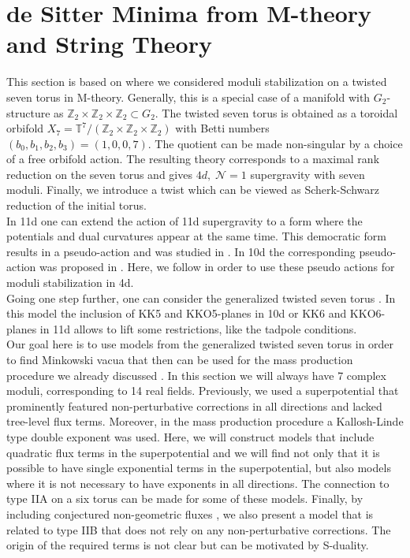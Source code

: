\documentclass[a4paper,12pt,twoside,openright]{report}
\begin{document}
\section{de Sitter Minima from M-theory and String Theory}
\label{sec:mtheory}
This section is based on \cite{Cribiori:2019hrb} where we considered moduli stabilization on a twisted seven torus in M-theory. Generally, this is a special case of a manifold with $G_2$-structure as $\mathbb{Z}_2 \times \mathbb{Z}_2 \times \mathbb{Z}_2 \subset G_2$. The twisted seven torus is obtained as a toroidal orbifold $X_7 = \mathbb{T}^7/(\mathbb{Z}_2 \times \mathbb{Z}_2 \times \mathbb{Z}_2)$ \cite{DallAgata:2005zlf,Duff:2010vy,Derendinger:2014wwa,Ferrara:2016fwe} with Betti numbers $(b_0,b_1,b_2,b_3) = (1,0,0,7)$. The quotient can be made non-singular by a choice of a free orbifold action. The resulting theory corresponds to a maximal rank reduction on the seven torus and gives $4d, \; \mathcal{N}=1$ supergravity with seven moduli. Finally, we introduce a twist which can be viewed as Scherk-Schwarz reduction \cite{Scherk:1978ta,Scherk:1979zr,Mueller-Hoissen:1987cwl,DallAgata:2005zlf,Grana:2013ila} of the initial torus.\\
In 11d one can extend the action of 11d supergravity to a form where the potentials and dual curvatures appear at the same time. This democratic form results in a pseudo-action and was studied in \cite{DallAgata:2005zlf}. In 10d the corresponding pseudo-action was proposed in \cite{Bergshoeff:2001pv}. Here, we follow \cite{DallAgata:2005zlf,Derendinger:2014wwa} in order to use these pseudo actions for moduli stabilization in 4d.\\
Going one step further, one can consider the generalized twisted seven torus \cite{Derendinger:2014wwa,Blaback:2018hdo,Villadoro:2007yq}. In this model the inclusion of KK5 and KKO5-planes in 10d or KK6 and KKO6-planes in 11d allows to lift some restrictions, like the tadpole conditions.\\
Our goal here is to use models from the generalized twisted seven torus in order to find Minkowski vacua that then can be used for the mass production procedure we already discussed \cite{Kallosh:2019zgd,Cribiori:2019drf}. In this section we will always have 7 complex moduli, corresponding to 14 real fields. Previously, we used a superpotential that prominently featured non-perturbative corrections in all directions and lacked tree-level flux terms. Moreover, in the mass production procedure a Kallosh-Linde type double exponent was used. Here, we will construct models that include quadratic flux terms in the superpotential and we will find not only that it is possible to have single exponential terms in the superpotential, but also models where it is not necessary to have exponents in all directions. The connection to type IIA on a six torus can be made for some of these models. Finally, by including conjectured non-geometric fluxes \cite{Aldazabal:2006up}, we also present a model that is related to type IIB that does not rely on any non-perturbative corrections. The origin of the required terms is not clear but can be motivated by S-duality.
\end{document}
